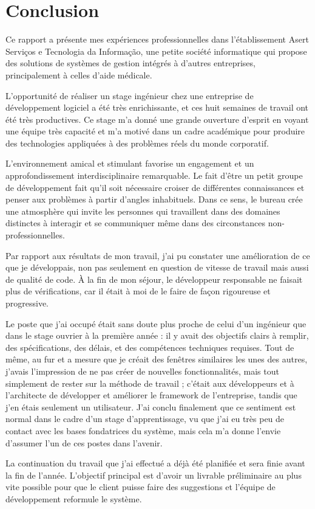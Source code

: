 \chapter{Conclusion}

Ce rapport a présente mes expériences professionnelles dans l'établissement Asert Serviços e Tecnologia da Informação, une petite société informatique qui propose des solutions de systèmes de gestion intégrés à d'autres entreprises, principalement à celles d'aide médicale. 

L'opportunité de réaliser un stage ingénieur chez une entreprise de développement logiciel a été très enrichissante, et ces huit semaines de travail ont été très productives. Ce stage m'a donné une grande ouverture d'esprit en voyant une équipe très capacité et m'a motivé dans un cadre académique pour produire des technologies appliquées à des problèmes réels du monde corporatif.

L'environnement amical et stimulant favorise un engagement et un approfondissement interdisciplinaire remarquable. Le fait d'être un petit groupe de développement fait qu'il soit nécessaire croiser de différentes connaissances et penser aux problèmes à partir d'angles inhabituels. Dans ce sens, le bureau crée une atmosphère qui invite les personnes qui travaillent dans des domaines distinctes à interagir et se communiquer même dans des circonstances non-professionnelles. 

Par rapport aux résultats de mon travail, j'ai pu constater une amélioration de ce que je développais, non pas seulement en question de vitesse de travail mais aussi de qualité de code. À la fin de mon séjour, le développeur responsable ne faisait plus de vérifications, car il était à moi de le faire de façon rigoureuse et progressive. 

Le poste que j'ai occupé était sans doute plus proche de celui d'un ingénieur que dans le stage ouvrier à la première année : il y avait des objectifs clairs à remplir, des spécifications, des délais, et des compétences techniques requises. Tout de même, au fur et a mesure que je créait des fenêtres similaires les unes des autres, j'avais l'impression de ne pas créer de nouvelles fonctionnalités, mais tout simplement de rester sur la méthode de travail ; c'était aux développeurs et à l'architecte de développer et améliorer le framework de l'entreprise, tandis que j'en étais seulement un utilisateur. J'ai conclu finalement que ce sentiment est normal dans le cadre d'un stage d'apprentissage, vu que j'ai eu très peu de contact avec les bases fondatrices du système, mais cela m'a donne l'envie d'assumer l'un de ces postes dans l'avenir.

La continuation du travail que j'ai effectué a déjà été planifiée et sera finie avant la fin de l'année. L'objectif principal est d'avoir un livrable préliminaire au plus vite possible pour que le client puisse faire des suggestions et l'équipe de développement reformule le système. 